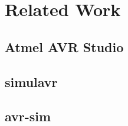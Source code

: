 
\chapter{Related Work} \label{chapter:relatedwork}

\section{Atmel AVR Studio}
\section{simulavr}
\section{avr-sim}

